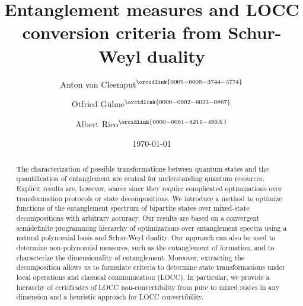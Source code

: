 \documentclass[aps,pra,twocolumn,superscriptaddress]{revtex4-2}
\begin{document}
\title{
Entanglement measures and LOCC conversion criteria from Schur-Weyl duality
}

\author{Anton van Cleemput$^{\orcidlink{0009-0005-3744-3774}}$}

\author{Otfried Gühne$^{\orcidlink{0000-0002-6033-0867}}$}

\author{Albert Rico$^{\orcidlink{0000-0001-8211-499X}}$}

\date{\today}
\begin{abstract}
The characterization of possible transformations between quantum states and the quantification of entanglement are central for understanding quantum resources. Explicit results are, however, scarce since they require complicated optimizations over transformation protocols or state decompositions. We introduce a method to optimize functions of the
entanglement spectrum of bipartite states over mixed-state decompositions with arbitrary accuracy. Our results are based on a convergent semidefinite programming hierarchy of optimizations over entanglement spectra using a natural polynomial basis and Schur-Weyl duality. Our approach can also be used
to determine non-polynomial measures, such as the entanglement of formation,
and to characterize the dimensionality of entanglement.
Moreover, extracting the decomposition allows us to formulate
criteria to determine state transformations under local operations
and classical communication (LOCC). In particular,
we provide a hierarchy of certificates of LOCC non-convertibility
from pure to mixed states in any dimension and a heuristic approach
for LOCC convertibility.
\end{abstract}

\maketitle
\end{document}
